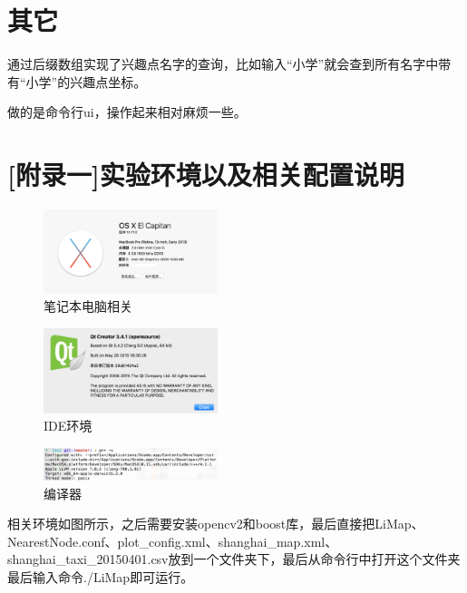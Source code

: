 \documentclass[10pt]{scrartcl}
\begin{document}
\section{其它}
通过后缀数组实现了兴趣点名字的查询，比如输入“小学”就会查到所有名字中带有“小学”的兴趣点坐标。

做的是命令行ui，操作起来相对麻烦一些。

\section{[附录一]实验环境以及相关配置说明}
\begin{figure}[htbp] 
\centering\includegraphics[width=2in]{实验电脑配置} 
\caption{笔记本电脑相关}\label{fig:6}
\end{figure} 
\begin{figure}[htbp] 
\centering\includegraphics[width=2in]{IDE环境} 
\caption{IDE环境}\label{fig:7}
\end{figure} 
\begin{figure}[htbp] 
\centering\includegraphics[width=2in]{编译器} 
\caption{编译器}\label{fig:8}
\end{figure} 

相关环境如图所示，之后需要安装opencv2和boost库，最后直接把LiMap、NearestNode.conf、plot\_config.xml、shanghai\_map.xml、shanghai\_taxi\_20150401.csv放到一个文件夹下，最后从命令行中打开这个文件夹最后输入命令./LiMap即可运行。
\end{document}
